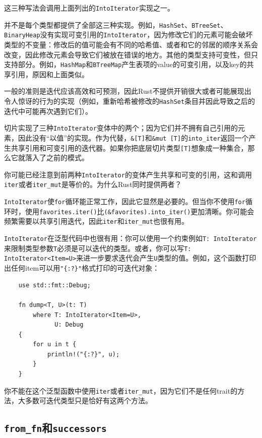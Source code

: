这三种写法会调用上面列出的\texttt{IntoIterator}实现之一。

并不是每个类型都提供了全部这三种实现。例如，\texttt{HashSet}、\texttt{BTreeSet}、\texttt{BinaryHeap}没有实现可变引用的\texttt{IntoIterator}，因为修改它们的元素可能会破坏类型的不变量：修改后的值可能会有不同的哈希值、或者和它的邻居的顺序关系会改变，因此修改元素会导致它们被放在错误的地方。其他的类型支持可变性，但只支持部分。例如，\texttt{HashMap}和\texttt{BTreeMap}产生表项的value的可变引用，以及key的共享引用，原因和上面类似。

一般的准则是迭代应该高效和可预测，因此Rust不提供开销很大或者可能展现出令人惊讶的行为的实现（例如，重新哈希被修改的\texttt{HashSet}条目并因此导致之后的迭代中可能再次遇到它们）。

切片实现了三种\texttt{IntoIterator}变体中的两个；因为它们并不拥有自己引用的元素，因此没有“以值”的实现。作为代替，\texttt{\&[T]}和\texttt{\&mut [T]}的\texttt{into\_iter}返回一个产生共享引用和可变引用的迭代器。如果你把底层切片类型\texttt{[T]}想象成一种集合，那么它就落入了之前的模式。

你可能已经注意到前两种\texttt{IntoIterator}的变体产生共享和可变的引用，这和调用\texttt{iter}或者\texttt{iter\_mut}是等价的。为什么Rust同时提供两者？

\texttt{IntoIterator}使\texttt{for}循环能正常工作，因此它显然是必要的。但当你不使用\texttt{for}循环时，使用\texttt{favorites.iter()}比\texttt{(\&favorites).into\_iter()}更加清晰。你可能会频繁需要以共享引用迭代，因此\texttt{iter}和\texttt{iter\_mut}也很有用。

\texttt{IntoIterator}在泛型代码中也很有用：你可以使用一个约束例如\texttt{T: IntoIterator}来限制类型参数\texttt{T}必须是可以迭代的类型。或者，你可以写\texttt{T: IntoIterator<Item=U>}来进一步要求迭代会产生\texttt{U}类型的值。例如，这个函数打印出任何item可以用\texttt{"\{:?\}"}格式打印的可迭代对象：
\begin{verbatim}
    use std::fmt::Debug;

    fn dump<T, U>(t: T)
        where T: IntoIterator<Item=U>,
              U: Debug
    {
        for u in t {
            println!("{:?}", u);
        }
    }
\end{verbatim}
你不能在这个泛型函数中使用\texttt{iter}或者\texttt{iter\_mut}，因为它们不是任何trait的方法，大多数可迭代类型只是恰好有这两个方法。

\subsection{\texttt{from\_fn}和\texttt{successors}}

